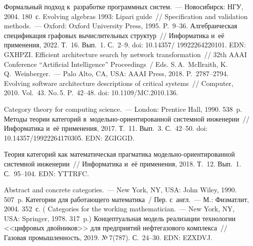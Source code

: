 \begin{multicols}{2}
{\small\frenchspacing
 { %
 \begin{thebibliography}{99}
 Формальный подход к~разработке программных сис\-тем.~--- 
Новосибирск: НГУ, 2004. 180~с.
 Evolving algebras 1993: Lipari guide~// Specification and validation methods.~--- 
Oxford: Oxford University Press, 1995. P.~9--36.
 Алгебраическая спецификация графовых вычислительных структур~// 
Информатика и~её применения, 2022. Т.~16. Вып.~1. С.~2--9. doi: 10.14357/ 19922264220101. 
EDN: GXHPZI.
 Efficient architecture search by network 
transformation~// 32th AAAI Conference  ``Artificial Intelligence'' Proceedings~/ Eds. 
S.\,A.~McIlraith, K.\,Q.~Weinberger.~--- Palo Alto, CA, USA: AAAI Press, 2018. P.~2787--2794.
    Evolving software architecture descriptions of critical 
systems~// Computer,  2010. Vol.~43. No.\,5. P.~42--48. doi: 10.1109/MC.2010.136.

 Category theory for computing science.~--- London: Prentice Hall, 1990. 
538~p.
    Методы теории категорий в~модельно-ори\-ен\-ти\-ро\-ван\-ной сис\-тем\-ной 
инженерии~// Информатика и~её применения, 2017. Т.~11. Вып.~3. С.~42--50. doi: 
10.14357/19922264170305. EDN: ZGIGGD.

    Теория категорий как математическая прагматика модельно-ориентированной сис\-тем\-ной инженерии~// Информатика и~её применения, 2018. Т.~12. 
Вып.~1. С.~95--104. EDN: YTTRFC.

 Abstract and concrete 
categories.~--- New York, NY, USA: John Wiley, 1990. 507~p.
 Категории для работающего математика~/ Пер. с~англ.~--- М.: Физматлит, 
2004. 352~с. ( Categories for the working mathematician.~--- New York, NY, 
USA: Springer, 1978. 317~p.)
    Концептуальная модель 
реализации технологии <<цифровых двойников>> для предприятий нефтегазового 
комплекса~// Газовая промышленность, 2019. №\,7(787). С.~24--30. EDN: EZXDVJ.

\end{thebibliography}

 }
 }

\end{multicols}

